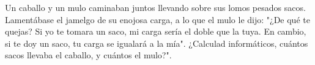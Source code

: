 Un caballo y un mulo caminaban juntos llevando sobre sus lomos pesados sacos. Lamentábase el jamelgo de su enojosa carga, a lo que el mulo le dijo: "¿De qué te quejas? Si yo te tomara un saco, mi carga sería el doble que la tuya. En cambio, si te doy un saco, tu carga se igualará a la mía". ¿Calculad informáticos, cuántos sacos llevaba el caballo, y cuántos el mulo?".
